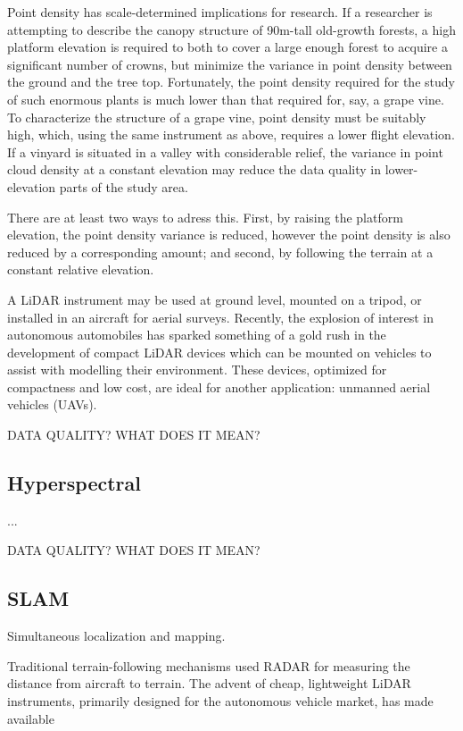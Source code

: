 \documentclass[10pt,a4paper]{report}
\begin{document}
Point density has scale-determined implications for research. If a researcher is attempting to describe the canopy structure of 90m-tall old-growth forests, a high platform elevation is required to both to cover a large enough forest to acquire a significant number of crowns, but minimize the variance in point density between the ground and the tree top. Fortunately, the point density required for the study of such enormous plants is much lower than that required for, say, a grape vine. To characterize the structure of a grape vine, point density must be suitably high, which, using the same instrument as above, requires a lower flight elevation. If a vinyard is situated in a valley with considerable relief, the variance in point cloud density at a constant elevation may reduce the data quality in lower-elevation  parts of the study area.

There are at least two ways to adress this. First, by raising the platform elevation, the point density variance is reduced, however the point density is also reduced by a corresponding amount; and second, by following the terrain at a constant relative elevation.

A LiDAR instrument may be used at ground level, mounted on a tripod, or installed in an aircraft for aerial surveys. Recently, the explosion of interest in autonomous automobiles has sparked something of a gold rush in the development of compact LiDAR devices which can be mounted on vehicles to assist with modelling their environment. These devices, optimized for compactness and low cost, are ideal for another application: unmanned aerial vehicles (UAVs).

DATA QUALITY? WHAT DOES IT MEAN?


\subsection{Hyperspectral}

...


DATA QUALITY? WHAT DOES IT MEAN?


\subsection{SLAM}

Simultaneous localization and mapping.

Traditional terrain-following mechanisms used RADAR for measuring the distance from aircraft to terrain. The advent of cheap, lightweight LiDAR instruments, primarily designed for the autonomous vehicle market, has made available 
\end{document}
